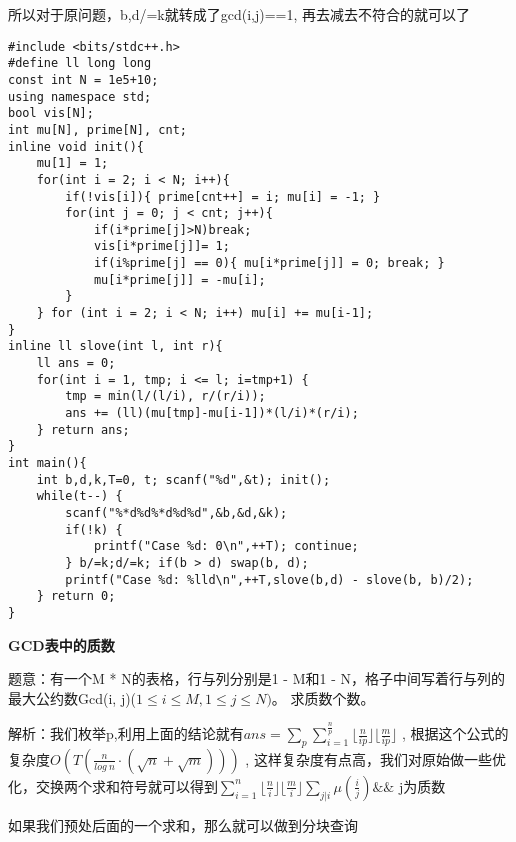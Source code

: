 所以对于原问题，b,d/=k就转成了gcd(i,j)==1, 再去减去不符合的就可以了

\begin{lstlisting}
#include <bits/stdc++.h>
#define ll long long
const int N = 1e5+10;
using namespace std;
bool vis[N];
int mu[N], prime[N], cnt;
inline void init(){ 
    mu[1] = 1;
    for(int i = 2; i < N; i++){
        if(!vis[i]){ prime[cnt++] = i; mu[i] = -1; }
        for(int j = 0; j < cnt; j++){
            if(i*prime[j]>N)break;
            vis[i*prime[j]]= 1;
            if(i%prime[j] == 0){ mu[i*prime[j]] = 0; break; }
            mu[i*prime[j]] = -mu[i];
        }
    } for (int i = 2; i < N; i++) mu[i] += mu[i-1];
}
inline ll slove(int l, int r){
    ll ans = 0;
    for(int i = 1, tmp; i <= l; i=tmp+1) {
        tmp = min(l/(l/i), r/(r/i));
        ans += (ll)(mu[tmp]-mu[i-1])*(l/i)*(r/i);
    } return ans;
}
int main(){
    int b,d,k,T=0, t; scanf("%d",&t); init();
    while(t--) {
        scanf("%*d%d%*d%d%d",&b,&d,&k);
        if(!k) {
            printf("Case %d: 0\n",++T); continue;
        } b/=k;d/=k; if(b > d) swap(b, d);
        printf("Case %d: %lld\n",++T,slove(b,d) - slove(b, b)/2);
    } return 0;
}
\end{lstlisting}

{\bfseries GCD表中的质数}

题意：有一个M * N的表格，行与列分别是1 - M和1 - N，格子中间写着行与列的最大公约数Gcd(i, j)($1 \le i \le M, 1 \le j \le N)$。  求质数个数。

解析：我们枚举p,利用上面的结论就有$ans = \sum_{p}\sum_{i=1}^{\frac{n}{p}} \lfloor \frac{n}{ip} \rfloor \lfloor \frac{m}{ip} \rfloor$ , 根据这个公式的复杂度$O(T (\frac{n}{log\ n}·(\sqrt{n}+\sqrt{m}) ) )$ , 这样复杂度有点高，我们对原始做一些优化，交换两个求和符号就可以得到$\sum_{i=1}^{n}\lfloor \frac{n}{i} \rfloor \lfloor \frac{m}{i} \rfloor \sum_{j|i}\mu(\frac{i}{j}) \&\& $ j为质数

如果我们预处后面的一个求和，那么就可以做到分块查询

